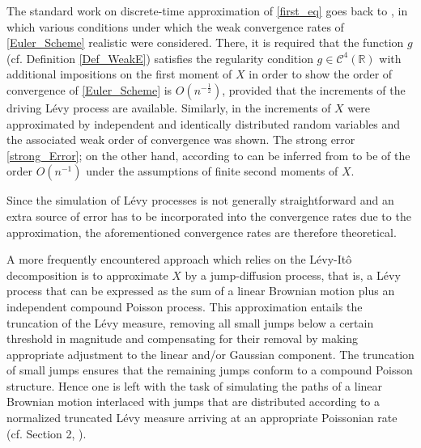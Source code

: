 The standard work on discrete-time approximation of \eqref{first_eq} goes back to , in which various conditions under which the weak convergence rates of \eqref{Euler_Scheme} realistic were considered. There, it is required that the function $g$ \break (cf. Definition \ref{Def_WeakE}) satisfies the regularity condition $g \in \mathcal{C}^4(\mathbb{R})$  with additional impositions on the first moment of $X$ in order to show the order of convergence of \eqref{Euler_Scheme} is $O(n^{-\frac{1}{2}})$, provided that the increments of the driving L\'evy process are available. Similarly, in   the increments of $X$ were approximated by independent and identically distributed random variables and the associated weak order of convergence was shown. The strong error \eqref{strong_Error}; on the other hand, according to  can be inferred from   to be of the order $O(n^{-1})$ under the assumptions of finite second moments of $X$.

Since the simulation of L\'evy processes is not generally straightforward and an extra source of error has to be incorporated into the convergence rates due to the approximation, the aforementioned convergence rates are therefore theoretical. 

A more frequently encountered approach which relies on the L\'evy-It\^o decomposition is to approximate $X$ by a jump-diffusion process, that is, a L\'evy process that can be expressed as the sum of a linear Brownian motion plus an independent compound Poisson process. This approximation entails the truncation of the L\'evy measure, removing all small jumps below a certain threshold in magnitude and compensating for their removal by making appropriate adjustment to the linear and/or Gaussian component. The truncation of small jumps ensures that the remaining jumps conform to a compound Poisson structure. Hence one is left with the task of simulating the paths of a linear Brownian motion interlaced with jumps that are  distributed according to a normalized truncated L\'evy measure arriving at an appropriate Poissonian rate (cf. Section 2, ). 

